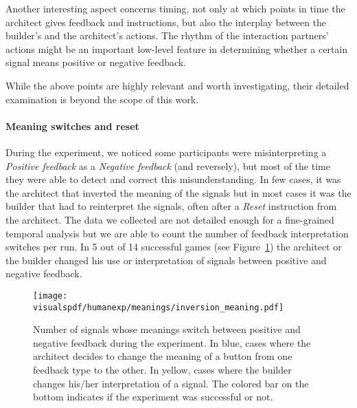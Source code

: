 Another interesting aspect concerns timing, not only at which points in time the architect gives feedback and instructions, but also the interplay between the builder's and the architect's actions. The rhythm of the interaction partners' actions might be an important low-level feature in determining whether a certain signal means positive or negative feedback.

While the above points are highly relevant and worth investigating, their detailed examination is beyond the scope of this work.

\paragraph{Meaning switches and reset} During the experiment, we noticed some participants were misinterpreting a \emph{Positive feedback} as a \emph{Negative feedback} (and reversely), but most of the time they were able to detect and correct this misunderstanding. In few cases, it was the architect that inverted the meaning of the signals but in most cases it was the builder that had to reinterpret the signals, often after a \emph{Reset} instruction from the architect. The data we collected are not detailed enough for a fine-grained temporal analysis but we are able to count the number of feedback interpretation switches per run. In 5 out of 14 successful games (see Figure~\ref{fig:feedback_switch_enhanced}) the architect or the builder changed his use or interpretation of signals between positive and negative feedback.

\begin{figure}[!htbp]
  \begin{center}
      \texttt{[image: \\visualspdf/humanexp/meanings/inversion\_meaning.pdf]}
      \caption{Number of signals whose meanings switch between positive and negative feedback during the experiment. In blue, cases where the architect decides to change the meaning of a button from one feedback type to the other. In yellow, cases where the builder changes his/her interpretation of a signal. The colored bar on the bottom indicates if the experiment was successful or not.}
    \label{fig:feedback_switch_enhanced}
    \end{center}
\end{figure}

